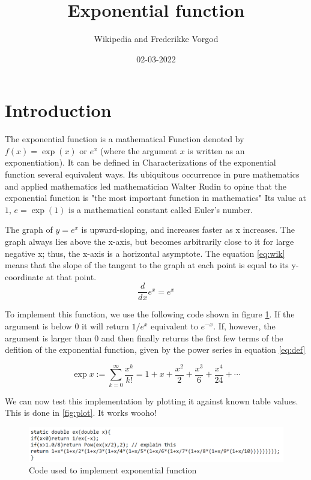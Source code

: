 \documentclass[twocolumn,a4paper,12pt]{article}
\begin{document}
\title{Exponential function}
\author{Wikipedia and Frederikke Vorgod}
\date{02-03-2022}
\maketitle
\section{Introduction}
The exponential function is a mathematical Function 
denoted by $f(x)=\exp(x)$ or $e^x$ (where the argument $x$ 
is written as an exponentiation). It can be defined in 
Characterizations of the exponential function several equivalent ways. 
Its ubiquitous occurrence in pure mathematics and applied mathematics 
led mathematician Walter Rudin to opine that the exponential function is 
"the most important function in mathematics"
Its value at $1$, $e = \exp(1)$ is a mathematical constant
called Euler's number. \

The graph of 
$y=e^{x}$ is upward-sloping, and increases faster as x increases. The graph always lies above the x-axis, but becomes arbitrarily close to it for large negative x; thus, the x-axis is a horizontal asymptote. The equation \ref{eq:wik} 
means that the slope of the tangent to the graph at each point is equal to its y-coordinate at that point.
\begin{equation}\label{eq:wik}
	\frac{d}{dx}e^x = e^x
\end{equation}

To implement this function, we use the following code shown in figure \ref{fig:code_exp}. 
If the argument is below $0$ it will return $1/e^x$ equivalent to $e^{-x}$. If, however, 
the argument is larger than $0$ 
and then finally returns the first few terms of the defition of the exponential function, given by
the power series in equation \ref{eq:def}

\begin{equation}\label{eq:def}
    \exp x := \sum_{k = 0}^{\infty} \frac{x^k}{k!} = 1 + x + \frac{x^2}{2} + \frac{x^3}{6} + \frac{x^4}{24} + \cdots
\end{equation}

We can now test this implementation by plotting it against known table values. This is done in \ref{fig:plot}. 
It works wooho!

\begin{figure}[b]\label{fig:code_exp}
    \includegraphics[width=\linewidth]{code_exp.png}
    \caption{Code used to implement exponential function}
\end{figure}
\end{document}
